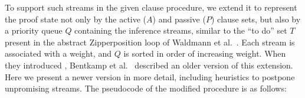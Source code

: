 \documentclass[smallcondensed,draft]{svjour3}     %
\begin{document}
To support such streams in the given clause procedure, we extend it to
represent the proof state not only by the active ($A$) and passive ($P$) clause
sets, but also by a priority queue $Q$ containing the inference streams,
similar to the ``to do'' set $T$ present in the abstract Zipperposition loop of 
Waldmann et al.\  \cite[Sect.~4]{wtrb-20-sat-framework}.
Each stream is associated with a weight, and $Q$ is sorted in order of
increasing weight.
When they introduced \lsup, Bentkamp et al.\
\cite{bbtvw-21-sup-lam} described an older version of this extension. Here
we present a newer version in more detail, including heuristics to postpone
unpromising streams. The pseudocode of the modified procedure is as follows:
\vspace{2.5\jot}
%
\newcommand\ParamMode{\ensuremath{K_{\mathrm{fair}}}}
\newcommand\ParamMaxStreams{\ensuremath{K_{\mathrm{best}}}}
\newcommand\ParamRetry{\ensuremath{K_{\mathrm{retry}}}}
\newcommand{\assign}[2]{\State \ensuremath{\mathit{#1} \gets #2}}
\newcommand{\assignSameLine}[2]{\ensuremath{\mathit{#1} \gets #2}}
\algrenewcommand\algorithmicindent{1em}
\end{document}
